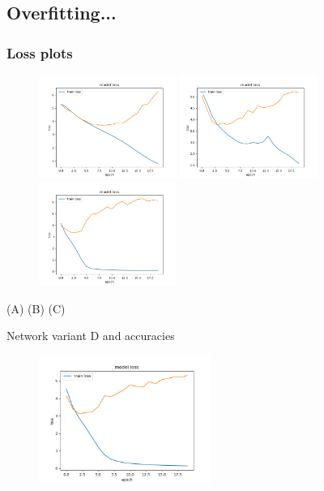 \documentclass{beamer}
\begin{document}
\subsection{Overfitting...}
\begin{frame}
  \frametitle{Loss plots}
  \centering
  \begin{figure}[!h]
  \centering
  \begin{adjustwidth}{-.4in}{-.4in}
    \includegraphics[width=0.4\textwidth]{images/run1_loss_a.png}
    \includegraphics[width=0.4\textwidth]{images/run1_loss_b.png}
    \includegraphics[width=0.4\textwidth]{images/run1_loss_c.png}
  \end{adjustwidth}
  \end{figure}
  (A) \hspace{3.5cm} (B) \hspace{3.5cm} (C)
\end{frame}

\begin{frame}
  \centering
  Network variant D and accuracies
  \begin{figure}[!h]
    \centering
    \includegraphics[width=0.5\textwidth]{images/run1_loss_d.png}
  \end{figure}
  
\end{frame}
\end{document}
